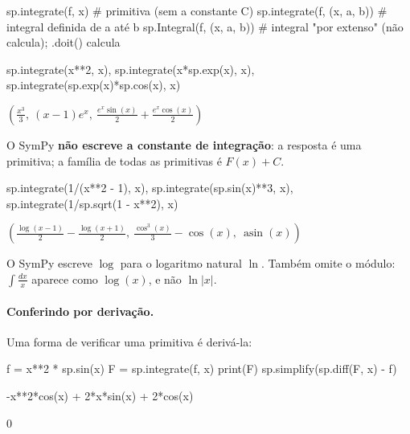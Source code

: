 \begin{sintaxe}
sp.integrate(f, x)               # primitiva (sem a constante C)
sp.integrate(f, (x, a, b))       # integral definida de a até b
sp.Integral(f, (x, a, b))        # integral "por extenso" (não calcula); .doit() calcula
\end{sintaxe}

\begin{entrada}
sp.integrate(x**2, x), sp.integrate(x*sp.exp(x), x), sp.integrate(sp.exp(x)*sp.cos(x), x)
\end{entrada}
\begin{saidamat}
$\displaystyle \left( \frac{x^{3}}{3}, \  \left(x - 1\right) e^{x}, \  \frac{e^{x} \sin{\left(x \right)}}{2} + \frac{e^{x} \cos{\left(x \right)}}{2}\right)$
\end{saidamat}

\begin{atencao}
O SymPy \textbf{não escreve a constante de integração}: a resposta é uma primitiva; a família de todas as
primitivas é $F(x)+C$.
\end{atencao}

\begin{entrada}
sp.integrate(1/(x**2 - 1), x), sp.integrate(sp.sin(x)**3, x), sp.integrate(1/sp.sqrt(1 - x**2), x)
\end{entrada}
\begin{saidamat}
$\displaystyle \left( \frac{\log{\left(x - 1 \right)}}{2} - \frac{\log{\left(x + 1 \right)}}{2}, \  \frac{\cos^{3}{\left(x \right)}}{3} - \cos{\left(x \right)}, \  \operatorname{asin}{\left(x \right)}\right)$
\end{saidamat}

\begin{observacao}
O SymPy escreve $\log$ para o logaritmo natural $\ln$. Também omite o módulo: $\int\frac{dx}{x}$ aparece como
$\log(x)$, e não $\ln|x|$.
\end{observacao}

\paragraph{Conferindo por derivação.} Uma forma de verificar uma primitiva é derivá-la:

\begin{entrada}
f = x**2 * sp.sin(x)
F = sp.integrate(f, x)
print(F)
sp.simplify(sp.diff(F, x) - f)
\end{entrada}
\begin{saida}
-x**2*cos(x) + 2*x*sin(x) + 2*cos(x)
\end{saida}
\begin{saidamat}
$\displaystyle 0$
\end{saidamat}

